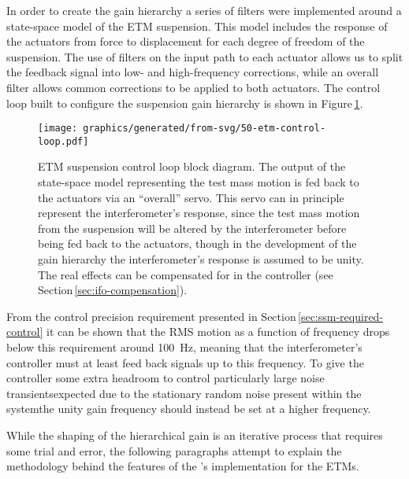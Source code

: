 In order to create the gain hierarchy a series of filters were implemented around a state-space model of the \gls{ETM} suspension. This model includes the response of the actuators from force to displacement for each degree of freedom of the suspension. The use of filters on the input path to each actuator allows us to split the feedback signal into low- and high-frequency corrections, while an overall filter allows common corrections to be applied to both actuators. The control loop built to configure the suspension gain hierarchy is shown in Figure\,\ref{fig:etm-control-loop}.

\begin{figure}
  \centering
  \texttt{[image: graphics/generated/from-svg/50-etm-control-loop.pdf]}
  \caption[End test mass suspension control loop block diagram]{\label{fig:etm-control-loop}\gls{ETM} suspension control loop block diagram. The output of the state-space model representing the test mass motion is fed back to the actuators via an ``overall'' servo. This servo can in principle represent the interferometer's response, since the test mass motion from the suspension will be altered by the interferometer before being fed back to the actuators, though in the development of the gain hierarchy the interferometer's response is assumed to be unity. The real effects can be compensated for in the controller (see Section\,\ref{sec:ifo-compensation}).}
\end{figure}

From the control precision requirement presented in Section\,\ref{sec:ssm-required-control} it can be shown that the \gls{RMS} motion as a function of frequency drops below this requirement around \SI{100}{\hertz}, meaning that the interferometer's controller must at least feed back signals up to this frequency. To give the controller some extra headroom to control particularly large noise transients\textemdash expected due to the stationary random noise present within the system\textemdash the unity gain frequency should instead be set at a higher frequency.

While the shaping of the hierarchical gain is an iterative process that requires some trial and error, the following paragraphs attempt to explain the methodology behind the features of the \SSMEXPT{}'s implementation for the \glspl{ETM}.

